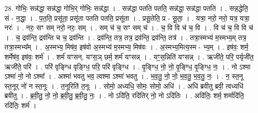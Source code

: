 \documentclass[17pt]{extarticle}
\begin{document}
28. गोभिः॒ सन्न॑द्धा॒ सन्न॑द्धा॒ गोभि॒र् गोभिः॒ सन्न॑द्धा । . सन्न॑द्धा पतति पतति॒ सन्न॑द्धा॒ सन्न॑द्धा पतति । . सन्न॒द्धेति॒ सं - न॒द्धा॒ । . प॒त॒ति॒ प्रसू॑ता॒ प्रसू॑ता पतति पतति॒ प्रसू॑ता । . प्रसू॒तेति॒ प्र - सू॒ता॒ । . यत्रा॒ नरो॒ नरो॒ यत्र॒ यत्रा॒ नरः॑ । . नरः॒ सꣳ सम् नरो॒ नरः॒ सम् । . सम् च॑ च॒ सꣳ सम् च॑ । . च॒ वि वि च॑ च॒ वि । . वि च॑ च॒ वि वि च॑ । . च॒ द्रव॑न्ति॒ द्रव॑न्ति च च॒ द्रव॑न्ति । . द्रव॑न्ति॒ तत्र॒ तत्र॒ द्रव॑न्ति॒ द्रव॑न्ति॒ तत्र॑ । . तत्रा॒स्मभ्य॑ म॒स्मभ्य॒म् तत्र॒ तत्रा॒स्मभ्य᳚म् । . अ॒स्मभ्य॒ मिष॑व॒ इष॑वो अ॒स्मभ्य॑ म॒स्मभ्य॒ मिष॑वः । . अ॒स्मभ्य॒मित्य॒स्म - भ्य॒म् । . इष॑वः॒ शर्म॒ शर्मेष॑व॒ इष॑वः॒ शर्म॑ । . शर्म॑ यꣳसन्. यꣳस॒ञ् छर्म॒ शर्म॑ यꣳसन्न् । . यꣳ॒॒स॒न्निति॑ यꣳसन्न् । . ऋजी॑ते॒ परि॒ पर्यृजी॑त॒ ऋजी॑ते॒ परि॑ । . परि॑ वृङ्ग्धि वृङ्ग्धि॒ परि॒ परि॑ वृङ्ग्धि । . वृ॒ङ्ग्धि॒ नो॒ नो॒ वृ॒ङ्ग्धि॒ वृ॒ङ्ग्धि॒ नः॒ । . नो ऽश्मा ऽश्मा॑ नो॒ नो ऽश्मा᳚ । . अश्मा॑ भवतु भव॒ त्वश्मा ऽश्मा॑ भवतु । . भ॒व॒तु॒ नो॒ नो॒ भ॒व॒तु॒ भ॒व॒तु॒ नः॒ । . न॒ स्त॒नू स्त॒नूर् नो॑ न स्त॒नूः । . त॒नूरिति॑ त॒नूः । . सोमो॒ अध्यधि॒ सोमः॒ सोमो॒ अधि॑ । . अधि॑ ब्रवीतु ब्रवी॒ त्वध्यधि॑ ब्रवीतु । . ब्र॒वी॒तु॒ नो॒ नो॒ ब्र॒वी॒तु॒ ब्र॒वी॒तु॒ नः॒ । . नो ऽदि॑ति॒ रदि॑तिर् नो॒ नो ऽदि॑तिः । . अदि॑तिः॒ शर्म॒ शर्मादि॑ति॒ रदि॑तिः॒ शर्म॑ । \newline
\end{document}
